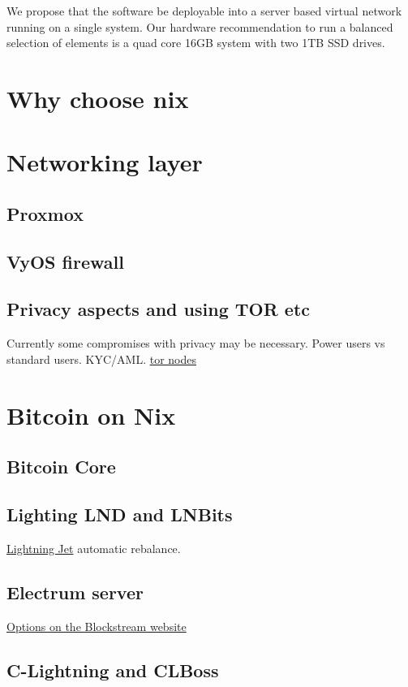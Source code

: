 We propose that the software be deployable into a server based virtual network running on a single system. Our hardware recommendation to run a balanced selection of elements is a quad core 16GB system with two 1TB SSD drives.
\section{Why choose nix}
\lipsum[50]
\section{Networking layer}
\lipsum[50]
\subsection{Proxmox}
\lipsum[50]
\subsection{VyOS firewall}
\lipsum[50]
\subsection{Privacy aspects and using TOR etc}
Currently some compromises with privacy may be necessary. Power users vs standard users. KYC/AML. 
\href{https://bitnodes.io/nodes/?q=.onion}{tor nodes}
\section{Bitcoin on Nix}
\lipsum[50]
\subsection{Bitcoin Core}
\lipsum[50]
\subsection{Lighting LND and LNBits}
\href{https://github.com/itsneski/lightning-jet}{Lightning Jet} automatic rebalance.

\lipsum[50]
\subsection{Electrum server}
\href{https://blog.blockstream.com/en-esplora-and-other-alternatives-to-electrumx/}{Options on the Blockstream website}
\lipsum[50]
\subsection{C-Lightning and CLBoss}

